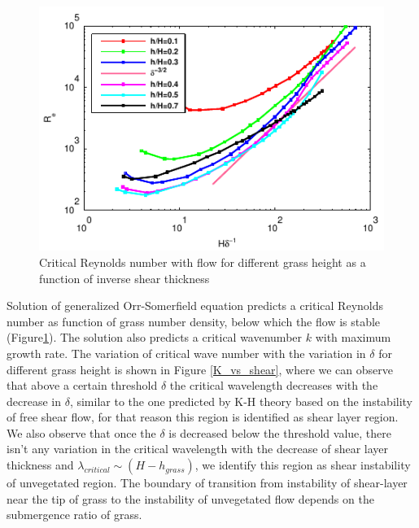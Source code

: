 \documentclass[aps,prl,twocolumn,showpacs,superscriptaddress,groupedaddress,10pt]{revtex4-1}  %
\begin{document}
\begin{figure}[htb]
\includegraphics[]{Critical_Re_vs_delta}
\caption{Critical Reynolds number with flow for different grass height as a function of inverse shear thickness}
\label{Re_vs_delta}
\end{figure}
Solution of generalized Orr-Somerfield equation predicts a critical Reynolds number as function of grass number density, below which the flow is stable 
(Figure\ref{Re_vs_delta}). The solution also predicts a critical wavenumber $k$ with maximum growth rate.
The variation of critical wave number with the variation in $\delta$ for different grass height is shown in Figure \ref{K_vs_shear}, where we can observe that above a 
certain threshold $\delta$ the critical wavelength decreases with the decrease in $\delta$, similar to the one predicted by K-H theory based on the instability of free shear flow, for that
reason this region is identified as shear layer region. We also observe that once the $\delta$ is decreased below the threshold value, there isn't any variation in the 
critical wavelength with the decrease of shear layer thickness and $\lambda_{critical} \sim (H-h_{grass})$, we identify this region as shear instability of unvegetated region.
The boundary of transition from instability of shear-layer near the tip of grass to the instability of unvegetated flow depends on the submergence ratio of grass. 
\end{document}
